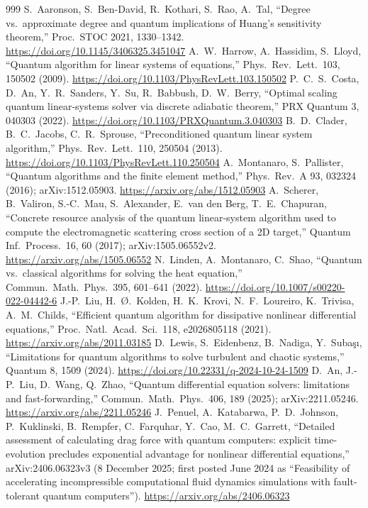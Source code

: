 \documentclass[10pt,a4paper]{article}
\begin{document}
\begin{thebibliography}{999}
 S.~Aaronson, S.~Ben-David, R.~Kothari, S.~Rao, A.~Tal, ``Degree vs.\ approximate degree and quantum implications of Huang's sensitivity theorem,'' Proc.\ STOC 2021, 1330--1342. \url{https://doi.org/10.1145/3406325.3451047}
 A.~W.~Harrow, A.~Hassidim, S.~Lloyd, ``Quantum algorithm for linear systems of equations,'' Phys.\ Rev.\ Lett.\ 103, 150502 (2009). \url{https://doi.org/10.1103/PhysRevLett.103.150502}
 P.~C.~S.~Costa, D.~An, Y.~R.~Sanders, Y.~Su, R.~Babbush, D.~W.~Berry, ``Optimal scaling quantum linear-systems solver via discrete adiabatic theorem,'' PRX Quantum 3, 040303 (2022). \url{https://doi.org/10.1103/PRXQuantum.3.040303}
 B.~D.~Clader, B.~C.~Jacobs, C.~R.~Sprouse, ``Preconditioned quantum linear system algorithm,'' Phys.\ Rev.\ Lett.\ 110, 250504 (2013). \url{https://doi.org/10.1103/PhysRevLett.110.250504}
 A.~Montanaro, S.~Pallister, ``Quantum algorithms and the finite element method,'' Phys.\ Rev.\ A 93, 032324 (2016); arXiv:1512.05903. \url{https://arxiv.org/abs/1512.05903}
 A.~Scherer, B.~Valiron, S.-C.~Mau, S.~Alexander, E.~van den Berg, T.~E.~Chapuran, ``Concrete resource analysis of the quantum linear-system algorithm used to compute the electromagnetic scattering cross section of a 2D target,'' Quantum Inf.\ Process.\ 16, 60 (2017); arXiv:1505.06552v2. \url{https://arxiv.org/abs/1505.06552}
 N.~Linden, A.~Montanaro, C.~Shao, ``Quantum vs.\ classical algorithms for solving the heat equation,'' Commun.\ Math.\ Phys.\ 395, 601--641 (2022). \url{https://doi.org/10.1007/s00220-022-04442-6}
 J.-P.~Liu, H.~{\O}.~Kolden, H.~K.~Krovi, N.~F.~Loureiro, K.~Trivisa, A.~M.~Childs, ``Efficient quantum algorithm for dissipative nonlinear differential equations,'' Proc.\ Natl.\ Acad.\ Sci.\ 118, e2026805118 (2021). \url{https://arxiv.org/abs/2011.03185}
 D.~Lewis, S.~Eidenbenz, B.~Nadiga, Y.~Suba\c{s}{\i}, ``Limitations for quantum algorithms to solve turbulent and chaotic systems,'' Quantum 8, 1509 (2024). \url{https://doi.org/10.22331/q-2024-10-24-1509}
 D.~An, J.-P.~Liu, D.~Wang, Q.~Zhao, ``Quantum differential equation solvers: limitations and fast-forwarding,'' Commun.\ Math.\ Phys.\ 406, 189 (2025); arXiv:2211.05246. \url{https://arxiv.org/abs/2211.05246}
 J.~Penuel, A.~Katabarwa, P.~D.~Johnson, P.~Kuklinski, B.~Rempfer, C.~Farquhar, Y.~Cao, M.~C.~Garrett, ``Detailed assessment of calculating drag force with quantum computers: explicit time-evolution precludes exponential advantage for nonlinear differential equations,'' arXiv:2406.06323v3 (8 December 2025; first posted June 2024 as ``Feasibility of accelerating incompressible computational fluid dynamics simulations with fault-tolerant quantum computers''). \url{https://arxiv.org/abs/2406.06323}

\end{thebibliography}
\end{document}
